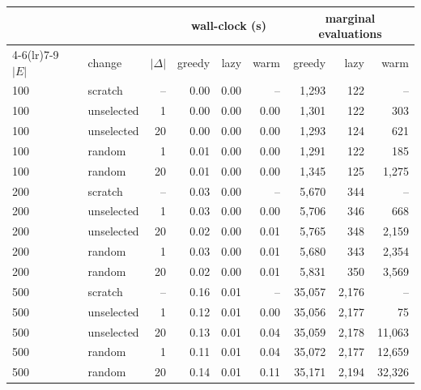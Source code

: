 \begin{tabular}{llrrrrrrr}
\toprule
& & & \multicolumn{3}{c}{wall-clock (s)} & \multicolumn{3}{c}{marginal evaluations} \\
\cmidrule(lr){4-6}\cmidrule(lr){7-9}
$|E|$ & change & $|\Delta|$ & greedy & lazy & warm & greedy & lazy & warm \\
\midrule
100 & scratch & -- & 0.00 & 0.00 & -- & 1,293 & 122 & -- \\
100 & unselected & 1 & 0.00 & 0.00 & 0.00 & 1,301 & 122 & 303 \\
100 & unselected & 20 & 0.00 & 0.00 & 0.00 & 1,293 & 124 & 621 \\
100 & random & 1 & 0.01 & 0.00 & 0.00 & 1,291 & 122 & 185 \\
100 & random & 20 & 0.01 & 0.00 & 0.00 & 1,345 & 125 & 1,275 \\
200 & scratch & -- & 0.03 & 0.00 & -- & 5,670 & 344 & -- \\
200 & unselected & 1 & 0.03 & 0.00 & 0.00 & 5,706 & 346 & 668 \\
200 & unselected & 20 & 0.02 & 0.00 & 0.01 & 5,765 & 348 & 2,159 \\
200 & random & 1 & 0.03 & 0.00 & 0.01 & 5,680 & 343 & 2,354 \\
200 & random & 20 & 0.02 & 0.00 & 0.01 & 5,831 & 350 & 3,569 \\
500 & scratch & -- & 0.16 & 0.01 & -- & 35,057 & 2,176 & -- \\
500 & unselected & 1 & 0.12 & 0.01 & 0.00 & 35,056 & 2,177 & 75 \\
500 & unselected & 20 & 0.13 & 0.01 & 0.04 & 35,059 & 2,178 & 11,063 \\
500 & random & 1 & 0.11 & 0.01 & 0.04 & 35,072 & 2,177 & 12,659 \\
500 & random & 20 & 0.14 & 0.01 & 0.11 & 35,171 & 2,194 & 32,326 \\
\bottomrule
\end{tabular}